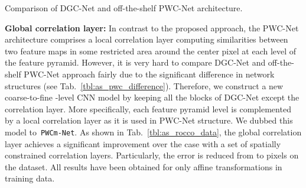 \documentclass[10pt,twocolumn,letterpaper]{article}
\begin{document}
\begin{table}[h!]
    \begin{subtable}[h]{.49\textwidth}
    \centering
        \vspace{-2mm}
        \caption{Comparison of DGC-Net and off-the-shelf PWC-Net architecture.}\label{tbl:as_pwc_difference}
        \end{subtable}
        \vspace{-2mm}
        \caption{\textbf{Ablation study.} We analyze the influence of different design choices of the proposed method. See Sec.~\ref{ssec:ablation_study} for more details. } \label{tbl:ablation_study}
\end{table}


\noindent\textbf{Global correlation layer:} In contrast to the proposed approach, the PWC-Net architecture comprises a local correlation layer computing similarities between two feature maps in some restricted area around the center pixel at each level of the feature pyramid. However, it is very hard to compare DGC-Net and off-the-shelf PWC-Net approach fairly due to the significant difference in network structures (see Tab.~\ref{tbl:as_pwc_difference}). Therefore, we construct a new coarse-to-fine -level CNN model by keeping all the blocks of DGC-Net except the correlation layer. More specifically, each feature pyramid level is complemented by a local correlation layer as it is used in PWC-Net structure. We dubbed this model to~\texttt{PWCm-Net}. As shown in Tab.~\ref{tbl:as_rocco_data}, the global correlation layer achieves a significant improvement over the case with a set of spatially constrained correlation layers. 
Particularly, the error is reduced from  to  pixels on the  dataset. All results have been obtained for only affine transformations in training data.
\end{document}
